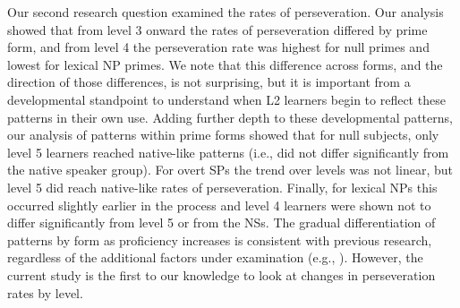 \documentclass[output=paper]{langscibook}
\begin{document}
Our second research question examined the rates of perseveration. Our analysis showed that from level 3 onward the rates of perseveration differed by prime form, and from level 4 the perseveration rate was highest for null primes and lowest for lexical NP primes. We note that this difference across forms, and the direction of those differences, is not surprising, but it is important from a developmental standpoint to understand when L2 learners begin to reflect these patterns in their own use. Adding further depth to these developmental patterns, our analysis of patterns within prime forms showed that for null subjects, only level 5 learners reached native-like patterns (i.e., did not differ significantly from the native speaker group). For overt SPs the trend over levels was not linear, but level 5 did reach native-like rates of perseveration. Finally, for lexical NPs this occurred slightly earlier in the process and level 4 learners were shown not to differ significantly from level 5 or from the NSs. The gradual differentiation of patterns by form as proficiency increases is consistent with previous research, regardless of the additional factors under examination (e.g., \citealt{GeeslinLinfordFafulas2015}). However, the current study is the first to our knowledge to look at changes in perseveration rates by level.
\end{document}
